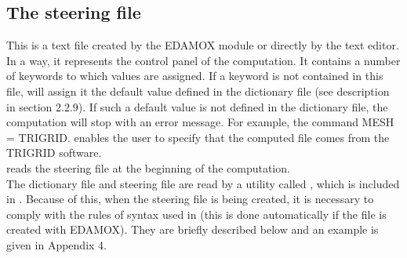 \subsection{The steering file}
This is a text file created by the EDAMOX module or directly by the text
editor. In a way, it represents the control panel of the computation. It
contains a number of keywords to which values are assigned. If a keyword is not
contained in this file, \stbtel will assign it the default value defined in the
dictionary file (see description in section 2.2.9). If such a default value is
not defined in the dictionary file, the computation will stop with an error
message. For example, the command MESH = TRIGRID. enables the user to specify
that the computed file comes from the TRIGRID software.\\
\stbtel reads the steering file at the beginning of the computation.\\
The dictionary file and steering file are read by a utility called \damo,
which is included in \stbtel. Because of this, when the steering file is being
created, it is necessary to comply with the rules of syntax used in \damo
(this is done automatically if the file is created with EDAMOX). They are
briefly described below and an example is given in Appendix 4.\\

